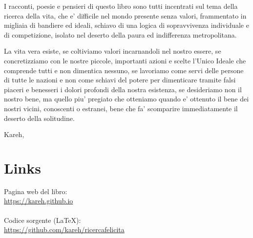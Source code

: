 I racconti, poesie e pensieri di questo libro sono tutti incentrati sul tema della ricerca della vita, che e' difficile nel mondo presente senza valori, frammentato in migliaia di bandiere ed ideali, schiavo di una logica di sopravvivenza individuale e di competizione, isolato nel deserto della paura ed indifferenza metropolitana.

La vita vera esiste, se coltiviamo valori incarnandoli nel nostro essere, se concretizziamo con le nostre piccole, importanti azioni e scelte l'Unico Ideale che comprende tutti e non dimentica nessuno, se lavoriamo come servi delle persone di tutte le nazioni e non come schiavi del potere per dimenticare tramite falsi piaceri e benesseri i dolori profondi della nostra esistenza, se desideriamo non il nostro bene, ma quello piu' pregiato che otteniamo quando e' ottenuto il bene dei nostri vicini, conoscenti o estranei, bene che fa' scomparire immediatamente il deserto della solitudine.

\begin{flushright}
    \vspace*{\fill}
    Kareh, \finishDate
\end{flushright}

\section{Links}

Pagina web del libro:\\
\url{https://kareh.github.io}\\

\leavevmode\\
Codice sorgente (LaTeX):\\
\url{https://github.com/kareh/ricercafelicita}

